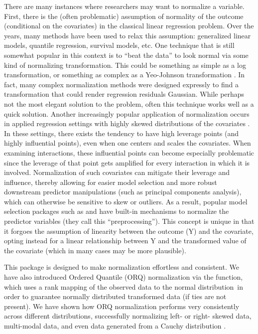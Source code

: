 There are many instances where researchers may want to normalize a
variable. First, there is the (often problematic) assumption of
normality of the outcome (conditional on the covariates) in the
classical linear regression problem. Over the years, many methods have
been used to relax this assumption: generalized linear models, quantile
regression, survival models, etc. One technique that is still somewhat
popular in this context is to ``beat the data'' to look normal via some
kind of normalizing transformation. This could be something as simple as
a log transformation, or something as complex as a Yeo-Johnson
transformation \citep{yeojohnson}. In fact, many complex normalization
methods were designed expressly to find a transformation that could
render regression residuals Gaussian. While perhaps not the most elegant
solution to the problem, often this technique works well as a quick
solution. Another increasingly popular application of normalization
occurs in applied regression settings with highly skewed distributions
of the covariates \citep{kuhn2013APM}. In these settings, there exists
the tendency to have high leverage points (and highly influential
points), even when one centers and scales the covariates. When examining
interactions, these influential points can become especially problematic
since the leverage of that point gets amplified for every interaction in
which it is involved. Normalization of such covariates can mitigate
their leverage and influence, thereby allowing for easier model
selection and more robust downstream predictor manipulations (such as
principal components analysis), which can otherwise be sensitive to skew
or outliers. As a result, popular model selection packages such as
 \citep{caret} and  \citep{recipes} have
built-in mechanisms to normalize the predictor variables (they call this
``preprocessing''). This concept is unique in that it forgoes the
assumption of linearity between the outcome (Y) and the covariate,
opting instead for a linear relationship between Y and the transformed
value of the covariate (which in many cases may be more plausible).

This package is designed to make normalization effortless and
consistent. We have also introduced Ordered Quantile (ORQ) normalization
via the  function, which uses a rank mapping of the
observed data to the normal distribution~in order to guarantee normally
distributed transformed data (if ties are not present). We have shown
how ORQ normalization performs very consistently across different
distributions, successfully normalizing left- or right- skewed data,
multi-modal data, and even data generated from a Cauchy distribution
\citep{orq_paper}.

